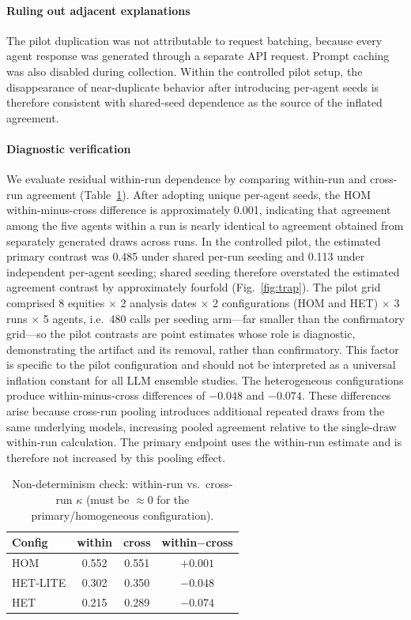 \documentclass{ieeeaccess}
\begin{document}
\paragraph{Ruling out adjacent explanations}
The pilot duplication was not attributable to request batching, because every
agent response was generated through a separate API request. Prompt caching was
also disabled during collection. Within the controlled pilot setup, the
disappearance of near-duplicate behavior after introducing per-agent seeds is
therefore consistent with shared-seed dependence as the source of the inflated
agreement.

\paragraph{Diagnostic verification}
We evaluate residual within-run dependence by comparing within-run and cross-run
agreement (Table~\ref{tab:nondet}). After adopting unique per-agent seeds, the
HOM within-minus-cross difference is approximately 0.001, indicating that
agreement among the five agents within a run is nearly identical to agreement
obtained from separately generated draws across runs. In the controlled pilot,
the estimated primary contrast was 0.485 under shared per-run seeding and 0.113
under independent per-agent seeding; shared seeding therefore overstated the
estimated agreement contrast by approximately fourfold
(Fig.~\ref{fig:trap}). The pilot grid comprised 8 equities $\times$ 2 analysis
dates $\times$ 2 configurations (HOM and HET) $\times$ 3 runs $\times$ 5
agents, i.e.\ 480 calls per seeding arm---far smaller than the confirmatory
grid---so the pilot contrasts are point estimates whose role is diagnostic,
demonstrating the artifact and its removal, rather than confirmatory. This
factor is specific to the pilot configuration and should not be interpreted as
a universal inflation constant for all LLM ensemble studies. The heterogeneous configurations produce within-minus-cross differences
of $-0.048$ and $-0.074$. These differences arise because cross-run pooling
introduces additional repeated draws from the same underlying models, increasing
pooled agreement relative to the single-draw within-run calculation. The primary
endpoint uses the within-run estimate and is therefore not increased by this
pooling effect.

\begin{table}[!t]
\centering
\caption{Non-determinism check: within-run vs.\ cross-run $\kappa$ (must be
$\approx 0$ for the primary/homogeneous configuration).}
\label{tab:nondet}
\begin{tabular}{lccc}
\toprule
Config & within & cross & within$-$cross \\
\midrule
HOM & 0.552 & 0.551 & $+0.001$ \\
HET-LITE & 0.302 & 0.350 & $-0.048$ \\
HET & 0.215 & 0.289 & $-0.074$ \\
\bottomrule
\end{tabular}
\end{table}
\end{document}
